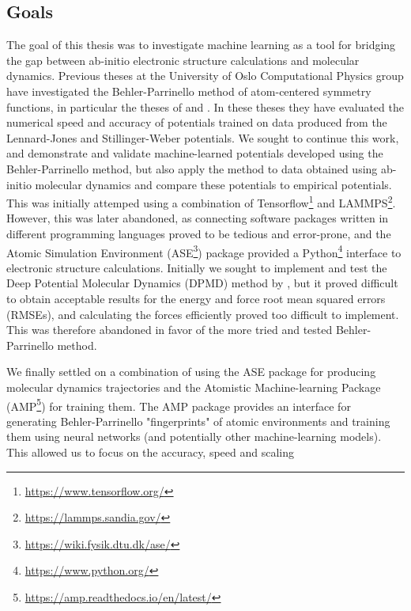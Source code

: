 \subsection{Goals}
The goal of this thesis was to investigate machine learning
as a tool for bridging the gap between ab-initio electronic structure
calculations and molecular dynamics. Previous theses at the University
of Oslo Computational Physics group have investigated the Behler-Parrinello\cite{
    behler2007generalized}
method of atom-centered symmetry functions, in particular the theses of
\parencite[Stende, John A,]{stende2017constructing} and
\parencite[Treider, H{\aa}kon Vik{\o}r]{treider2017speeding}.
In these theses they have evaluated the
numerical speed and accuracy of potentials trained on data
produced from the Lennard-Jones
and Stillinger-Weber potentials.
We sought to continue this work, and demonstrate and validate machine-learned
potentials developed using the Behler-Parrinello method, but also apply
the method to data obtained using ab-initio molecular dynamics
and compare these potentials to empirical potentials.
This was initially attemped using a combination of Tensorflow\footnote{
    \url{https://www.tensorflow.org/}} and LAMMPS\footnote{
    \url{https://lammps.sandia.gov/}}.
However, this was later abandoned, as connecting software packages written
in different programming languages proved to be tedious and error-prone,
and the Atomic Simulation Environment (ASE\footnote{
    \url{https://wiki.fysik.dtu.dk/ase/}}) package provided a Python\footnote{
    \url{https://www.python.org/}} 
interface to electronic structure calculations.
Initially we sought to implement and test the Deep Potential Molecular Dynamics
(DPMD) method by \parencite[Zhang et al.]{PhysRevLett.120.143001}, but
it proved difficult to obtain acceptable results for the energy
and force root mean squared errors (RMSEs), and calculating the forces
efficiently proved too difficult to implement. This was therefore abandoned
in favor of the more tried and tested Behler-Parrinello method.
\par
We finally settled on a combination of using the ASE package for producing
molecular dynamics trajectories and the Atomistic Machine-learning Package
(AMP\footnote{\url{https://amp.readthedocs.io/en/latest/}}) 
for training them. 
The AMP package provides an interface
for generating Behler-Parrinello "fingerprints" of atomic environments
and training them using neural networks (and potentially other machine-learning
models). This allowed us to focus on the accuracy, speed and scaling
